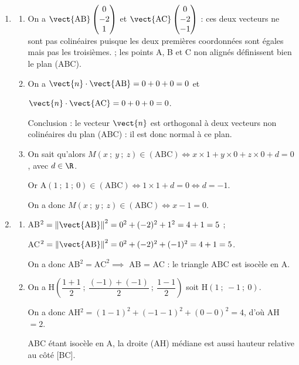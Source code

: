 \begin{enumerate}
On a donc B$(1~;~- 1~;~1) \in (d) \cap \mathcal{P}$.
\item 
	\begin{enumerate}
		\item 
		
		On a $\vect{\text{AB}}\begin{pmatrix}0\\-2\\1\end{pmatrix}$ et $\vect{\text{AC}}\begin{pmatrix}0\\-2\\- 1\end{pmatrix}$ : ces deux vecteurs ne sont pas colinéaires puisque les deux premières coordonnées sont égales mais pas les troisièmes. ; les points A, B et C non alignés définissent bien le plan (ABC).
		\item 
		On a $\vect{n} \cdot \vect{\text{AB}} = 0 + 0 + 0 = 0$ et 
		
$\vect{n} \cdot \vect{\text{AC}} = 0 + 0 + 0 = 0$.

Conclusion : le vecteur $\vect{n}$ est orthogonal à deux vecteurs non colinéaires du plan (ABC) : il est donc normal à ce plan.
		\item 
On sait qu'alors $M(x~;~y~;~z) \in (\text{ABC}) \iff x \times 1 + y\times 0 + z \times 0 + d = 0$, avec $d \in \R$.

Or A$(1~;~1~;~0) \in (\text{ABC}) \iff 1 \times 1 + d = 0  \iff d = - 1$.

On a donc $M(x~;~y~;~z) \in (\text{ABC}) \iff x - 1 = 0$.
	\end{enumerate}
\item 
	\begin{enumerate}
		\item 
AB$^2 = \left\|\vect{\text{AB}}\right\|^2 = 0^2 + (- 2)^2 + 1^2 = 4 + 1 = 5$ ;

AC$^2 = \left\|\vect{\text{AB}}\right\|^2 = 0^2 + (- 2)^2 + (- 1)^2 = 4 + 1 = 5$.

On a donc AB$^2 = \text{AC}^2 \implies $ AB = AC : le triangle ABC est isocèle en A.
		\item 
		On a H$\left(\dfrac{1+1}{2}~;~\dfrac{(- 1) + (- 1)}{2}~;~\dfrac{1 - 1}{2} \right)$ soit H$(1~;~- 1~;~0)$.
		
On a donc AH$^2 = (1 - 1)^2 + (- 1 - 1)^2 + (0 - 0)^2 = 4$, d'où AH $ = 2$.

ABC étant isocèle en A, la droite (AH) médiane est aussi hauteur relative au côté [BC].


\end{enumerate}
\end{enumerate}

